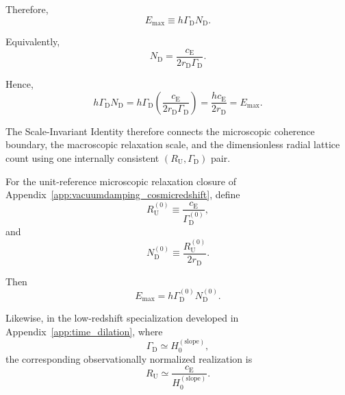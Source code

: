 Therefore,
\begin{equation}
    \boxed{
    E_{\mathrm{max}}
    \equiv
    h\Gamma_{\mathrm D}N_{\mathrm D}.
    }
\end{equation}

Equivalently,
\begin{equation}
    \boxed{
    N_{\mathrm D}
    =
    \frac{
        c_{\mathrm E}
    }{
        2r_{\mathrm D}\Gamma_{\mathrm D}
    }.
    }
\end{equation}

Hence,
\begin{equation}
    h\Gamma_{\mathrm D}N_{\mathrm D}
    =
    h\Gamma_{\mathrm D}
    \left(
        \frac{
            c_{\mathrm E}
        }{
            2r_{\mathrm D}\Gamma_{\mathrm D}
        }
    \right)
    =
    \frac{
        hc_{\mathrm E}
    }{
        2r_{\mathrm D}
    }
    =
    E_{\mathrm{max}}.
\end{equation}

The Scale-Invariant Identity therefore connects the microscopic coherence
boundary, the macroscopic relaxation scale, and the dimensionless radial
lattice count using one internally consistent
$(R_{\mathrm U},\Gamma_{\mathrm D})$ pair.

For the unit-reference microscopic relaxation closure of
Appendix~\ref{app:vacuumdamping_cosmicredshift}, define
\begin{equation}
    R_{\mathrm U}^{(0)}
    \equiv
    \frac{
        c_{\mathrm E}
    }{
        \Gamma_{\mathrm D}^{(0)}
    },
\end{equation}
and
\begin{equation}
    N_{\mathrm D}^{(0)}
    \equiv
    \frac{
        R_{\mathrm U}^{(0)}
    }{
        2r_{\mathrm D}
    }.
\end{equation}

Then
\begin{equation}
    \boxed{
    E_{\mathrm{max}}
    =
    h
    \Gamma_{\mathrm D}^{(0)}
    N_{\mathrm D}^{(0)}.
    }
\end{equation}

Likewise, in the low-redshift specialization developed in
Appendix~\ref{app:time_dilation}, where
\begin{equation}
    \Gamma_{\mathrm D}
    \simeq
    H_{0}^{(\mathrm{slope})},
\end{equation}
the corresponding observationally normalized realization is
\begin{equation}
    R_{\mathrm U}
    \simeq
    \frac{
        c_{\mathrm E}
    }{
        H_{0}^{(\mathrm{slope})}
    }.
\end{equation}

